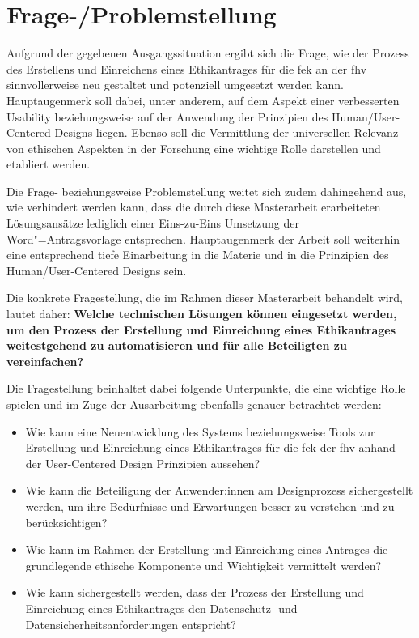 \documentclass[a4paper,12pt,twoside]{scrreprt}
\begin{document}
\section{Frage-/Problemstellung}
\label{sec:frage-problemstellung}

Aufgrund der gegebenen Ausgangssituation ergibt sich die Frage, wie der Prozess des Erstellens und Einreichens eines Ethikantrages für die \acl{fek} an der \acl{fhv} sinnvollerweise neu gestaltet und potenziell umgesetzt werden kann. Hauptaugenmerk soll dabei, unter anderem, auf dem Aspekt einer verbesserten Usability beziehungsweise auf der Anwendung der Prinzipien des Human/User-Centered Designs liegen. Ebenso soll die Vermittlung der universellen Relevanz von ethischen Aspekten in der Forschung eine wichtige Rolle darstellen und etabliert werden.

Die Frage- beziehungsweise Problemstellung weitet sich zudem dahingehend aus, wie verhindert werden kann, dass die durch diese Masterarbeit erarbeiteten Lösungsansätze lediglich einer Eins-zu-Eins Umsetzung der Word"=Antragsvorlage entsprechen. Hauptaugenmerk der Arbeit soll weiterhin eine entsprechend tiefe Einarbeitung in die Materie und in die Prinzipien des Human/User-Centered Designs sein.

\medskip

Die konkrete Fragestellung, die im Rahmen dieser Masterarbeit behandelt wird, lautet daher:\newline
\textbf{Welche technischen Lösungen können eingesetzt werden, um den Prozess der Erstellung und Einreichung eines Ethikantrages weitestgehend zu automatisieren und für alle Beteiligten zu vereinfachen?}

\medskip

Die Fragestellung beinhaltet dabei folgende Unterpunkte, die eine wichtige Rolle spielen und im Zuge der Ausarbeitung ebenfalls genauer betrachtet werden:
\begin{itemize}
    \item Wie kann eine Neuentwicklung des Systems beziehungsweise Tools zur Erstellung und Einreichung eines Ethikantrages für die \acl{fek} der \acl{fhv} anhand der User-Centered Design Prinzipien aussehen?
    \item Wie kann die Beteiligung der Anwender:innen am Designprozess sichergestellt werden, um ihre Bedürfnisse und Erwartungen besser zu verstehen und zu berücksichtigen?
    \item Wie kann im Rahmen der Erstellung und Einreichung eines Antrages die grundlegende ethische Komponente und Wichtigkeit vermittelt werden?
    \item Wie kann sichergestellt werden, dass der Prozess der Erstellung und Einreichung eines Ethikantrages den Datenschutz- und Datensicherheitsanforderungen entspricht?
\end{itemize}
\end{document}
